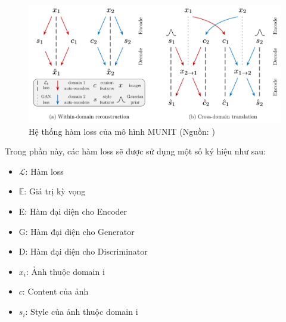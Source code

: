 {    \begin{figure}[H]
    \centering
    \includegraphics[width=12cm] {images/loss_munit.png}
    \caption{Hệ thống hàm loss của mô hình MUNIT (Nguồn: \cite{munit})}
    \label{fig:loss_munit}
    \end{figure}

    \noindent Trong phần này, các hàm loss sẽ được sử dụng một số ký hiệu như sau:
    \begin{itemize}[leftmargin=0cm,itemindent=.5cm,labelwidth=\itemindent,labelsep=0cm,align=left]
        \item $\mathcal{L}$: Hàm loss
        \item $\mathbb{E}$: Giá trị kỳ vọng
        \item E: Hàm đại diện cho Encoder
        \item G: Hàm đại diện cho Generator
        \item D: Hàm đại diện cho Discriminator
        \item ${x}_{i}$: Ảnh thuộc domain i
        \item $c$: Content của ảnh
        \item ${s}_{i}$: Style của ảnh thuộc domain i
    \end{itemize}

}
